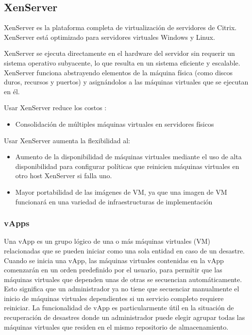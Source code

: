 \documentclass[preprint,12pt]{elsarticle}
\begin{document}
\subsection {\textbf{XenServer}}
XenServer es la plataforma completa de virtualización de servidores de Citrix. XenServer está optimizado para servidores virtuales Windows y Linux.

XenServer se ejecuta directamente en el hardware del servidor sin requerir un sistema operativo subyacente, lo que resulta en un sistema eficiente y escalable. XenServer funciona abstrayendo elementos de la máquina física (como discos duros, recursos y puertos) y asignándolos a las máquinas virtuales que se ejecutan en él.

Usar XenServer reduce los costos :
\begin{itemize}
\item Consolidación de múltiples máquinas virtuales en servidores físicos
\end{itemize}
Usar XenServer aumenta la flexibilidad al:
\begin{itemize}
\item Aumento de la disponibilidad de máquinas virtuales mediante el uso de alta disponibilidad para configurar políticas que reinicien máquinas virtuales en otro host XenServer si falla uno.
\item Mayor portabilidad de las imágenes de VM, ya que una imagen de VM funcionará en una variedad de infraestructuras de implementación
\end{itemize}

\subsubsection{\textbf{vApps}}
Una vApp es un grupo lógico de una o más máquinas virtuales (VM) relacionadas que se pueden iniciar como una sola entidad en caso de un desastre. Cuando se inicia una vApp, las máquinas virtuales contenidas en la vApp comenzarán en un orden predefinido por el usuario, para permitir que las máquinas virtuales que dependen unas de otras se secuencian automáticamente. Esto significa que un administrador ya no tiene que secuenciar manualmente el inicio de máquinas virtuales dependientes si un servicio completo requiere reiniciar.  La funcionalidad de vApp es particularmente útil en la situación de recuperación de desastres donde un administrador puede elegir agrupar todas las máquinas virtuales que residen en el mismo repositorio de almacenamiento.
\end{document}
